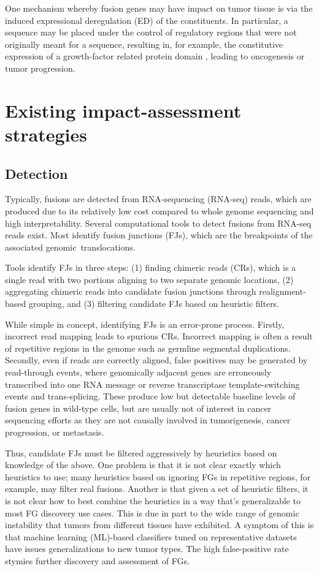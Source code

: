 One mechanism whereby fusion genes may have impact on tumor tissue is
via the induced expressional deregulation (ED) of the constituents. In particular, a sequence may be placed under the control of regulatory regions that were not originally meant for a sequence, resulting in, for example, the constitutive expression of a growth-factor related protein domain \cite{weinberg_biology_2013}, leading to oncogenesis or tumor progression. 


\section{Existing impact-assessment strategies}
\subsection{Detection}
Typically, fusions are detected from RNA-sequencing (RNA-seq) reads,
which are produced due to its relatively low cost compared to whole
genome sequencing and high interpretability. Several computational
tools to detect fusions from RNA-seq reads exist. Most identify fusion
junctions (FJs), which are the breakpoints of the associated
genomic translocations.

Tools identify FJs in three steps: (1) finding chimeric reads (CRs), which is a single read with two portions aligning to two separate genomic locations, (2) aggregating chimeric reads into candidate fusion junctions through realignment-based grouping, and (3) filtering candidate FJs based on heuristic filters. 

While simple in concept, identifying FJs is an error-prone process. Firstly, incorrect read mapping leads to spurious CRs. Incorrect mapping is often a result of repetitive regions in the genome such as germline segmental duplications. Secondly, even if reads are correctly aligned, false positives may be generated by read-through events, where genomically adjacent genes are erroneously transcribed into one RNA message or reverse transcriptase template-switching events and trans-splicing. These produce low but detectable baseline levels of fusion genes in wild-type cells, but are usually not of interest in cancer sequencing efforts as they are not causally involved in tumorigenesis, cancer progression, or metastasis\cite{gingeras_implications_2009}. 

Thus, candidate FJs must be filtered aggressively by heuristics based on knowledge of the above. One problem is that it is not clear exactly which heuristics to use; many heuristics based on ignoring FGs in repetitive regions, for example, may filter real fusions\cite{kumar_identifying_2016}. Another is that given a set of heuristic filters, it is not clear how to best combine the heuristics in a way that’s generalizable to most FG discovery use cases. This is due in part to the wide range of genomic instability that tumors from different tissues have exhibited. A symptom of this is that machine learning (ML)-based classifiers tuned on representative datasets have issues generalizations to new tumor types. The high false-positive rate stymies further discovery and assessment of FGs. 

